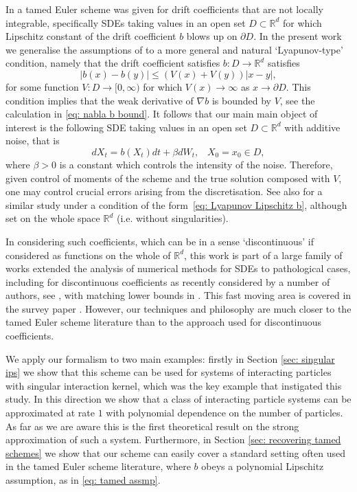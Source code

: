\documentclass{article}
\begin{document}
In \cite{JOHNSTON2026104772} a tamed Euler scheme was given for drift coefficients that are not locally integrable, specifically SDEs taking values in an open set $D\subset \mathbb{R}^d$ for which Lipschitz constant of the drift coefficient $b$ blows up on $\partial D$. In the present work we generalise the assumptions of \cite{JOHNSTON2026104772} to a more general and natural `Lyapunov-type' condition, namely that the drift coefficient satisfies $b:D\to\mathbb{R}^d$ satisfies
\begin{equation}\label{eq: Lyapunov Lipschitz b}
      \lvert  b(x)- b(y)\rvert \leq  ( V(x)+ V(y))\lvert x-y \rvert,
\end{equation}
for some function $V:D\to[0,\infty)$ for which $V(x)\to\infty$ as $x\to\partial D$. This condition implies that the weak derivative of $\nabla b$ is bounded by $V$, see the calculation in \eqref{eq: nabla b bound}. It follows that our main main object of interest is the following SDE taking values in an open set $D\subset \mathbb{R}^d$ with additive noise, that is
\begin{equation}\label{eq: SDE main}
    dX_t=b(X_t)dt+\beta dW_t, \;\;\;X_0=x_0\in D,
\end{equation}
where $\beta>0$ is a constant which controls the intensity of the noise. Therefore, given control of moments of the scheme and the true solution composed with $V$, one may control crucial errors arising from the discretisation. See also \cite{chak2024regularity} for a similar study under a condition of the form~\eqref{eq: Lyapunov Lipschitz b}, although set on the whole space $\mathbb R^d$ (i.e. without singularities).

In considering such coefficients, which can be in a sense `discontinuous' if considered as functions on the whole of $\mathbb{R}^d$, this work is part of a large family of works extended the analysis of numerical methods for SDEs to pathological cases, including for discontinuous coefficients as recently considered by a number of authors, see \cite{Leobacher2016multi, articlemg, 10.1214/20-EJP479, 10.1214/22-AAP1867}, with matching lower bounds in \cite{nonliplowerbound, 10.1214/22-AAP1837,ELLINGER2024101822}. This fast moving area is covered in the survey paper \cite{mullergronbach2024complexity}. However, our techniques and philosophy are much closer to the tamed Euler scheme literature than to the approach used for discontinuous coefficients.

We apply our formalism to two main examples: firstly in Section \ref{sec: singular ips} we show that  this scheme can be used for systems of interacting particles with singular interaction kernel, which was the key example that instigated this study. In this direction we show that a class of interacting particle systems can be approximated at rate $1$ with polynomial dependence on the number of particles. As far as we are aware this is the first theoretical result on the strong approximation of such a system. Furthermore, in Section \ref{sec: recovering tamed schemes} we show that our scheme can easily cover a standard setting often used  in the tamed Euler scheme literature, where $b$ obeys a polynomial Lipschitz assumption, as in \eqref{eq: tamed assmp}.
\end{document}
